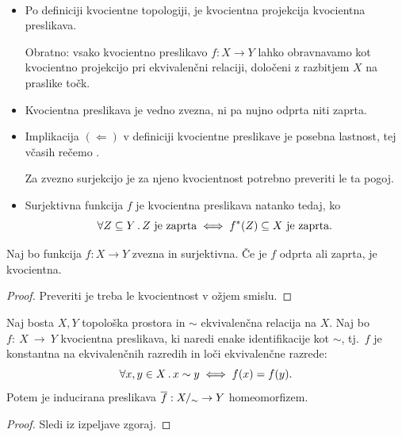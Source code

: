 \begin{opomba}
    \
    \begin{itemize}
        \item Po definiciji kvocientne topologiji, je kvocientna projekcija kvocientna preslikava. 
        
        Obratno: vsako kvocientno preslikavo \(f: X \to Y\) lahko obravnavamo kot kvocientno projekcijo pri ekvivalenčni relaciji, določeni z razbitjem \(X\) na praslike točk.
        \item Kvocientna preslikava je vedno zvezna, ni pa nujno odprta niti zaprta.
        \item Implikacija \((\Leftarrow)\) v definiciji kvocientne preslikave je posebna lastnost, tej včasih rečemo .
        
        Za zvezno surjekcijo je za njeno kvocientnost potrebno preveriti le ta pogoj.
        \item Surjektivna funkcija \(f\) je kvocientna preslikava natanko tedaj, ko 
        \[\forall Z \subseteq Y \,.\, Z \ \text{je zaprta} \iff f^{*}(Z) \subseteq X \ \text{je zaprta}.\]
    \end{itemize}
\end{opomba}

\begin{lema}
    Naj bo funkcija \(f: X \to Y\) zvezna in surjektivna. Če je \(f\) odprta ali zaprta, je kvocientna.
\end{lema}

\begin{proof}
    Preveriti je treba le kvocientnost v ožjem smislu.
\end{proof}

\begin{izrek}
    Naj bosta \(X, Y\) topološka prostora in \(\sim\) ekvivalenčna relacija na \(X\). Naj bo \(f:~X~\to~Y\) kvocientna preslikava, ki naredi enake identifikacije kot \(\sim\), tj.\ \(f\) je konstantna na ekvivalenčnih razredih in loči ekvivalenčne razrede:
    \[\forall x, y \in X \,.\, x \sim y \iff f(x) = f(y).\]
    Potem je inducirana preslikava \(\overline{f}: {X/_\sim} \to Y\) homeomorfizem.
\end{izrek}

\begin{proof}
    Sledi iz izpeljave zgoraj.
\end{proof}

